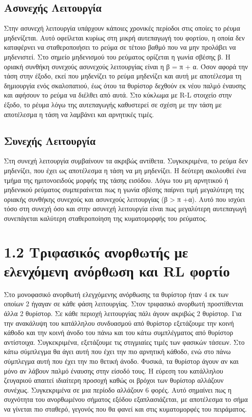 \subsection*{Ασυνεχής Λειτουργία}

Στην ασυνεχή λειτουργία υπάρχουν κάποιες χρονικές περίοδοι στις οποίες το ρέυμα μηδενίζεται. Αυτό οφείλεται κυρίως στη μικρή αυτεπαγωγή του φορτίου, η οποία δεν καταφέρνει να σταθεροποιήσει το ρεύμα σε τέτοιο βαθμό που να μην προλάβει να μηδενιστεί. Στο σημείο μηδενισμού του ρεύματος ορίζεται η γωνία σβέσης β. Η οριακή συνθήκη συνεχούς ασυνεχούς λειτουργίας είναι η β = π + α.
Όσον αφορά την τάση στην έξοδο, εκεί που μηδενίζει το ρεύμα μηδενίζει και αυτή με αποτέλεσμα τη δημιουργία ενός σκαλοπατιού, έως ότου τα θυρίστορ δεχθούν εκ νέου παλμό έναυσης και αφήσουν το ρεύμα να διέλθει από αυτά. Στο κύκλωμα με R-L στοιχείο στην έξοδο, το ρέυμα λόγω της αυτεπαγωγής καθυστερεί σε σχέση με την τάση με αποτέλεσμα η τάση να λαμβάνει και αρνητικές τιμές.


\subsection*{Συνεχής Λειτουργία}

Στη συνεχή λειτουργία συμβαίνουν τα ακριβώς αντίθετα. Συγκεκριμένα, το ρεύμα δεν μηδενίζει, που έχει ως αποτέλεσμα η τάση να μη μηδενίζει. Η δεύτερη ακολουθεί ένα τμήμα της ημιτονοειδούς μορφής της τάσης εισόδου. Λόγω του μη αρνητικού ή μηδενικού ρεύματος συμπεραίνεται πως η γωνία σβέσης παίρνει τιμή μεγαλύτερη της οριακής συνθήκης συνεχούς και ασυνεχούς λειτουργίας (β > π +α). Αυτό που ισχύει τόσο στη συνεχή όσο και στην ασυνεχή λειτουργία είναι πως μεγαλύτερη αυτεπαγωγή συνεπάγεται καλύτερη σταθεροποίηση της κυματομορφής του ρεύματος.

\newpage
\section*{1.2 Τριφασικός ανορθωτής με ελενχόμενη ανόρθωση και RL φορτίο}

Στο μονοφασικό ανορθωτή ελεγχόμενης ανόρθωσης τα θυρίστορ ήταν 4 εκ των οποίων 2 ήγαγαν σε κάθε φάση λειτουργίας. Στον τριφασικό ανορθωτή προστίθενται άλλα 2 θυρίστορ. Σε κάθε περιοχή λειτουργίας πάλι άγουν ακριβώς 2 θυρίστορ. Για την ανακάλυψη του κατάλληλου συνδυασμού από θυρίστορ εξετάζουμε την κοινή κάθοδο και την κοινή άνοδο του πάνω και του κάτω συμπλέγματος από θυρίστορ αντίστοιχα. Συγκεκριμένα, εξετάζουμε τις στιγμιαίες τιμές των φασικών τάσεων. Στο κάτω σύμπλεγμα θα άγει αυτή που έχει την πιο αρνητική κάθοδο, ενώ
στο πάνω σύμπλεγμα αυτή που έχει την πιο θετική άνοδο. Φυσικά, τα θυρίστορ άγουν αν και μόνο αν λάβουν παλμό έναυσης στην είσοδό τους. Η εύρεση του κατάλληλου ζευγαριού απαιτεί ιδιαίτερη προσοχή καθώς οι βρόχοι των θυρίστορ
αλλάζουν συνέχως. Συγκεκριμένα σε μια περίοδο αλλάζουν 6 φορές. Αυτό σημαίνει πως η συχνότητα του ανορθωμένου σήματος εξόδου εξαπλασιάζεται, με αποτέλεσμα το σήμα να γίνεται πιο σταθερό, γεγονός που θα φανεί και στις κυματομορφές του πειράματος.
